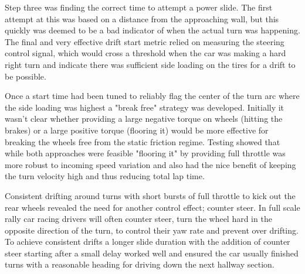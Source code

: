 \documentclass[letterpaper, 10 pt, conference]{ieeeconf}  %
\begin{document}
Step three was finding the correct time to attempt a power slide. The first attempt at this was based on a distance from the approaching wall, but this quickly was deemed to be a bad indicator of when the actual turn was happening. The final and very effective drift start metric relied on measuring the steering control signal, which would cross a threshold when the car was making a hard right turn and indicate there was sufficient side loading on the tires for a drift to be possible.


Once a start time had been tuned to reliably flag the center of the turn arc where the side loading was highest a "break free" strategy was developed. Initially it wasn't clear whether providing a large negative torque on wheels (hitting the brakes) or a large positive torque (flooring it) would be more effective for breaking the wheels free from the static friction regime. Testing showed that while both approaches were feasible "flooring it" by providing full throttle was more robust to incoming speed variation and also had the nice benefit of keeping the turn velocity high and thus reducing total lap time. 


Consistent drifting around turns with short bursts of full throttle to kick out the rear wheels revealed the need for another control effect; counter steer. In full scale rally car racing drivers will often counter steer, turn the wheel hard in the opposite direction of the turn, to control their yaw rate and prevent over drifting. To achieve consistent drifts a longer slide duration with the addition of counter steer starting after a small delay worked well and ensured the car usually finished turns with a reasonable heading for driving down the next hallway section.
\end{document}
